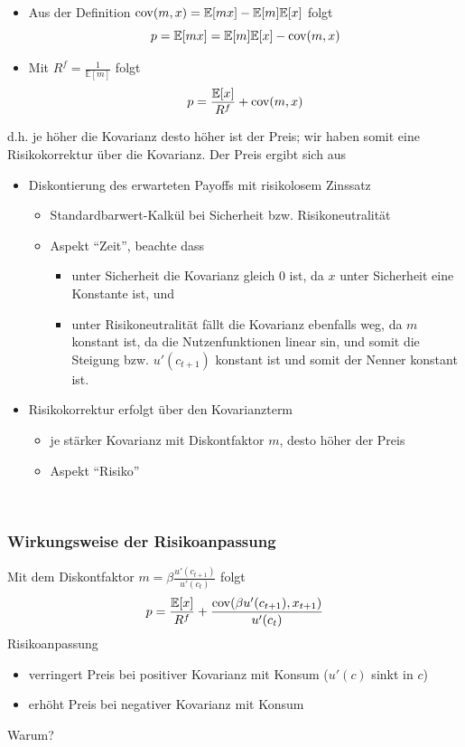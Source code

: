 \documentclass[12pt]{extreport} %
\theoremstyle{named}
\theoremstyle{nnamed}
\theoremstyle{itshape}
\theoremstyle{normal}
\begin{document}
\begin{itemize}
	\item Aus der Definition $\operatorname{cov}(m,x) = \mathbb{E}[mx] -  \mathbb{E}[m]  \mathbb{E}[x]$ folgt
		$$ p =  \mathbb{E}[mx] =  \mathbb{E}[m] \mathbb{E}[x] - \operatorname{cov}(m, x) $$
	\item Mit $R^f = \frac{1}{\mathbb{E}[m]}$ folgt
		$$ p = \frac{\mathbb{E}[x]}{R^f} + \operatorname{cov}(m, x) $$
\end{itemize}

d.h. je höher die Kovarianz desto höher ist der Preis; wir haben somit eine Risikokorrektur über die Kovarianz. Der Preis ergibt sich aus
\begin{itemize}
	\item Diskontierung des erwarteten Payoffs mit risikolosem Zinssatz
		\begin{itemize}
			\item Standardbarwert-Kalkül bei Sicherheit bzw. Risikoneutralität
			\item Aspekt \enquote{Zeit}, beachte dass 
			\begin{itemize}
				\item unter Sicherheit die Kovarianz gleich 0 ist, da $x$ unter Sicherheit eine Konstante ist, und 
				\item unter Risikoneutralität fällt die Kovarianz ebenfalls weg, da $m$  konstant ist, da die Nutzenfunktionen linear sin, und somit die Steigung bzw. $u'(c_{t+1})$ konstant ist und somit der Nenner konstant ist.
			\end{itemize} 
		\end{itemize}
	\item Risikokorrektur erfolgt über den Kovarianzterm
		\begin{itemize}
			\item je stärker Kovarianz mit Diskontfaktor $m$, desto höher der Preis
			\item Aspekt \enquote{Risiko}
		\end{itemize}
\end{itemize}

~\newpage

\subsubsection{Wirkungsweise der Risikoanpassung}

Mit dem Diskontfaktor $m = \beta \frac{u'(c_{t+1})}{u'(c_t)}$ folgt
	$$	p = \frac{\mathbb{E}[x]}{R^f} + \frac{\operatorname{cov}(\beta u'(c_{t+1}), x_{t+1})}{u'(c_t)} $$
Risikoanpassung
\begin{itemize}
	\item verringert Preis bei positiver Kovarianz mit Konsum ($u'(c)$ sinkt in $c$)
	\item erhöht Preis bei negativer Kovarianz mit Konsum
\end{itemize}
Warum?
\end{document}
